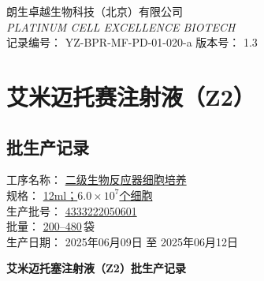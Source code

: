 \documentclass[UTF8,10pt,a4paper,fontset=fandol]{ctexart}
\newcommand{\fieldvalue}[1]{#1}
\newcommand{\handwritten}[1]{#1}
\begin{document}

\newpage

\begin{center}
朗生卓越生物科技（北京）有限公司\\
\textit{PLATINUM CELL EXCELLENCE BIOTECH}\\[0.4em]
记录编号：
\fieldvalue{YZ-BPR-MF-PD-01-020-a}
\qquad
版本号：
\fieldvalue{1.3}\\[1.2em]

\section*{艾米迈托赛注射液（Z2）}
\subsection*{批生产记录}
\end{center}

\noindent
工序名称：
\underline{\fieldvalue{二级生物反应器细胞培养}}
\\[1.2em]

\noindent
规\quad 格：
\underline{\fieldvalue{12ml；$6.0\times 10^{7}$个细胞}}
\\[1.2em]

\noindent
生产批号：
\underline{\fieldvalue{\handwritten{4333222050601}}}
\\[1.2em]

\noindent
批\quad 量：
\underline{\fieldvalue{\handwritten{200--480}}}\,袋
\\[1.2em]

\noindent
生产日期：
\fieldvalue{\handwritten{2025年06月09日}}
至
\fieldvalue{\handwritten{2025年06月12日}}

\newpage

\begin{center}
\textbf{艾米迈托塞注射液（Z2）批生产记录}
\end{center}
\end{document}
